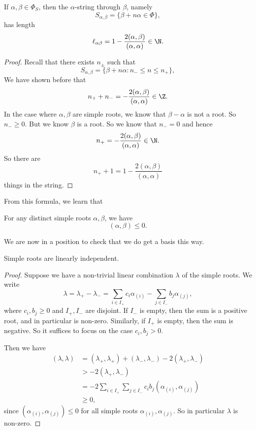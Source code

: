 \documentclass[a4paper]{article}
\begin{document}
\begin{prop}
  If $\alpha, \beta \in \Phi_S$, then the $\alpha$-string through $\beta$, namely
  \[
    S_{\alpha, \beta} = \{\beta + n \alpha \in \Phi\},
  \]
  has length
  \[
    \ell_{\alpha\beta} = 1 - \frac{2 (\alpha, \beta)}{(\alpha, \alpha)} \in \N.
  \]
\end{prop}

\begin{proof}
  Recall that there exists $n_{\pm}$ such that
  \[
    S_{\alpha, \beta} = \{\beta + n \alpha: n_- \leq n \leq n_+\},
  \]
  We have shown before that
  \[
    n_+ + n_- = - \frac{2(\alpha, \beta)}{(\alpha, \alpha)} \in \Z.
  \]
  In the case where $\alpha, \beta$ are simple roots, we know that $\beta - \alpha$ is not a root. So $n_- \geq 0$. But we know $\beta$ is a root. So we know that $n_- = 0$ and hence
  \[
    n_+ = -\frac{2(\alpha, \beta)}{(\alpha, \alpha)} \in \N.
  \]
  So there are
  \[
    n_+ + 1 = 1 - \frac{2(\alpha, \beta)}{(\alpha, \alpha)}
  \]
  things in the string.
\end{proof}
From this formula, we learn that

\begin{cor}
  For any distinct simple roots $\alpha, \beta$, we have
  \[
    (\alpha, \beta) \leq 0.
  \]
\end{cor}

We are now in a position to check that we do get a basis this way.

\begin{prop}
  Simple roots are linearly independent.
\end{prop}

\begin{proof}
  Suppose we have a non-trivial linear combination $\lambda$ of the simple roots. We write
  \[
    \lambda = \lambda_+ - \lambda_- = \sum_{i \in I_+} c_i \alpha_{(i)} - \sum_{j \in I_-} b_j \alpha_{(j)},
  \]
  where $c_i, b_j \geq 0$ and $I_+, I_-$ are disjoint. If $I_-$ is empty, then the sum is a positive root, and in particular is non-zero. Similarly, if $I_+$ is empty, then the sum is negative. So it suffices to focus on the case $c_i, b_j > 0$.

  Then we have
  \begin{align*}
    (\lambda, \lambda) &= (\lambda_+, \lambda_+) + (\lambda_-, \lambda_-) - 2 (\lambda_+, \lambda_-)\\
    &> -2(\lambda_+, \lambda_-)\\
    &= -2 \sum_{i \in I_+}\sum_{j \in I_-} c_i b_j (\alpha_{(i)}, \alpha_{(j)})\\
    &\geq 0,
  \end{align*}
  since $(\alpha_{(i)}, \alpha_{(j)}) \leq 0$ for all simple roots $\alpha_{(i)}, \alpha_{(j)}$. So in particular $\lambda$ is non-zero.
\end{proof}
\end{document}
